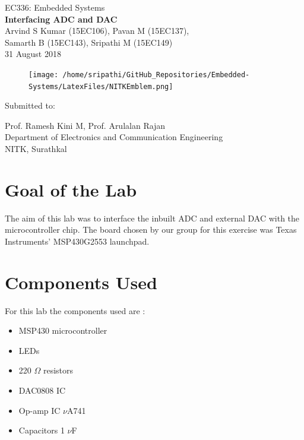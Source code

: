\documentclass[12pt, letterpaper]{article}
\begin{document}
\begin{titlepage}

\begin{center}
	\large{EC336: Embedded Systems}\\
	\huge{\textbf{Interfacing ADC and DAC}}\\
	\large{Arvind S Kumar (15EC106), Pavan M (15EC137),\\ Samarth B (15EC143), Sripathi M (15EC149)}\\
	\large{31 August 2018}
\end{center}	

\begin{figure}[!h]
	\centering
	\texttt{[image: /home/sripathi/GitHub\_Repositories/Embedded-Systems/LatexFiles/NITKEmblem.png]}
	\label{fig:NITKEmblem}
\end{figure}	
\begin{center}
	
\huge{Submitted to:}\\
\begin{large}
Prof. Ramesh Kini M, Prof. Arulalan Rajan\\
Department of Electronics and Communication Engineering\\
NITK, Surathkal
\end{large}

\end{center}

\end{titlepage}

\section{Goal of the Lab}

The aim of this lab was to interface the inbuilt ADC and external DAC  with the microcontroller chip. The board chosen by our group for this exercise was Texas Instruments' MSP430G2553 launchpad.

\section{Components Used}

For this lab the components used are :

\begin{itemize}
	\item MSP430 microcontroller
	\item LEDs
	\item 220 $\Omega$ resistors
	\item DAC0808 IC 
	\item Op-amp IC $\nu$A741
	\item Capacitors 1 $\nu$F
\end{itemize}
\end{document}
